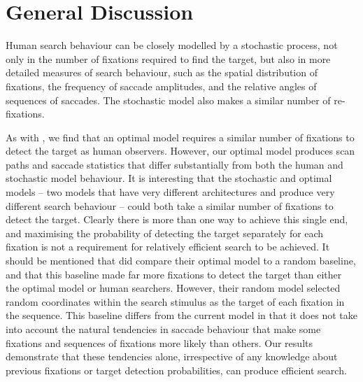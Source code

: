 \documentclass[preprint, authoryear]{elsarticle} %
\begin{document}
\section{General Discussion}

Human search behaviour can be closely modelled by a stochastic process, not only in the number of fixations required to find the target, but also in more detailed measures of search behaviour, such as the spatial distribution of fixations, the frequency of saccade amplitudes, and the relative angles of sequences of saccades. The stochastic model also makes a similar number of re-fixations.

\par

As with \cite{najemnik-geisler2005,najemnik-geisler2008}, we find that an optimal model requires a similar number of fixations to detect the target as human observers. However, our optimal model produces scan paths and saccade statistics that differ substantially from both the human and stochastic model behaviour. It is interesting that the stochastic and optimal models -- two models that have very different architectures and produce very different search behaviour -- could both take a similar number of fixations to detect the target. Clearly there is more than one way to achieve this single end, and maximising the probability of detecting the target separately for each fixation is not a requirement for relatively efficient search to be achieved. It should be mentioned that  \cite{najemnik-geisler2005} did compare their optimal model to a random baseline, and that this baseline made far more fixations to detect the target than either the optimal model or human searchers. However, their random model selected random coordinates within the search stimulus as the target of each fixation in the sequence. This baseline differs from the current model in that it does not take into account the natural tendencies in saccade behaviour that make some fixations and sequences of fixations more likely than others. Our results demonstrate that these tendencies alone, irrespective of any knowledge about previous fixations or target detection probabilities, can produce efficient search. 
\par
\end{document}
